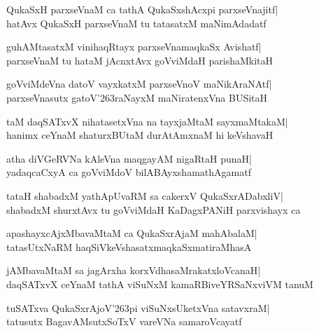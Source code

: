 \documentclass[twoside,12pt,openright]{book}
\def\S{\char'263}
\newcounter{shloka}[chapter]
\begin{document}
\begin{shloka}%
QukaSxH parxseVnaM ca tathA QukaSxshAcxpi parxseVnajitf|\\
hatAvx QukaSxH parxseVnaM tu tatasatxM maNimAdadatf
\end{shloka}

\begin{shloka}%
guhAMtasatxM vinihaqRtayx parxseVnamaqkaSx Avishatf|\\
parxseVnaM tu hataM jAcnxtAvx goVviMdaH parishaMkitaH
\end{shloka}

\begin{shloka}%
goVviMdeVna datoV vayxkatxM parxseVnoV maNikAraNAtf|\\
parxseVnasutx gatoV\S raNayxM maNiratenxVna BUSitaH
\end{shloka}

\begin{shloka}%
taM daqSATxvX nihatasetxVna na tayxjaMtaM sayxmaMtakaM|\\
hanimx ceYnaM shaturxBUtaM durAtAmxnaM hi keVshavaH
\end{shloka}

\begin{shloka}%
atha diVGeRVNa kAleVna maqgayAM nigaRtaH punaH|\\
yadaqcaCxyA ca goVviMdoV bilABAyxshamathAgamatf
\end{shloka}

\begin{shloka}%
tataH shabadxM yathApUvaRM sa cakerxV QukaSxrADabxliV|\\
shabadxM shurxtAvx tu goVviMdaH KaDagxPANiH parxvishayx ca
\end{shloka}

\begin{shloka}%
apashayxcAjxMbavaMtaM ca QukaSxrAjaM mahAbalaM|\\
tatasUtxNaRM haqSiVkeVshasatxmaqkaSxmatiraMhasA
\end{shloka}

\begin{shloka}%
jAMbavaMtaM sa jagArxha korxVdhasaMrakatxloVcanaH|\\
daqSATxvX ceYnaM tathA viSuNxM kamaRBiveYRSaNxviVM tanuM
\end{shloka}

\begin{shloka}%
tuSATxva QukaSxrAjoV\S pi viSuNxsUketxVna satavxraM|\\
tatusutx BagavAMsutxSoTxV vareVNa samaroVcayatf
\end{shloka}
\end{document}
